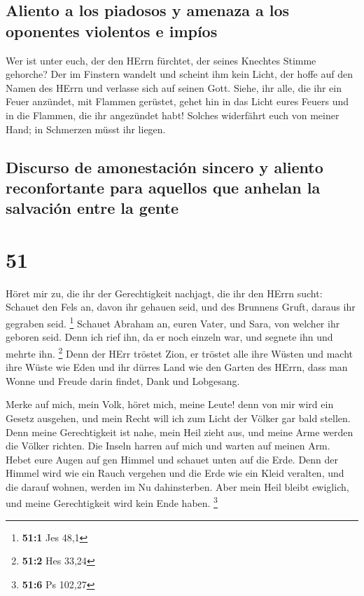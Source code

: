 \hypertarget{aliento-a-los-piadosos-y-amenaza-a-los-oponentes-violentos-e-impuxedos}{%
\subsection{Aliento a los piadosos y amenaza a los oponentes violentos e
impíos}\label{aliento-a-los-piadosos-y-amenaza-a-los-oponentes-violentos-e-impuxedos}}

 Wer ist unter euch, der den HErrn fürchtet, der seines
Knechtes Stimme gehorche? Der im Finstern wandelt und scheint ihm kein
Licht, der hoffe auf den Namen des HErrn und verlasse sich auf seinen
Gott.  Siehe, ihr alle, die ihr ein Feuer anzündet, mit
Flammen gerüstet, gehet hin in das Licht eures Feuers und in die
Flammen, die ihr angezündet habt! Solches widerfährt euch von meiner
Hand; in Schmerzen müsst ihr liegen.

\hypertarget{discurso-de-amonestaciuxf3n-sincero-y-aliento-reconfortante-para-aquellos-que-anhelan-la-salvaciuxf3n-entre-la-gente}{%
\subsection{Discurso de amonestación sincero y aliento reconfortante
para aquellos que anhelan la salvación entre la
gente}\label{discurso-de-amonestaciuxf3n-sincero-y-aliento-reconfortante-para-aquellos-que-anhelan-la-salvaciuxf3n-entre-la-gente}}

\hypertarget{section-50}{%
\section{51}\label{section-50}}

 Höret mir zu, die ihr der Gerechtigkeit nachjagt, die ihr
den HErrn sucht: Schauet den Fels an, davon ihr gehauen seid, und des
Brunnens Gruft, daraus ihr gegraben seid. \footnote{\textbf{51:1} Jes
  48,1}  Schauet Abraham an, euren Vater, und Sara, von
welcher ihr geboren seid. Denn ich rief ihn, da er noch einzeln war, und
segnete ihn und mehrte ihn. \footnote{\textbf{51:2} Hes 33,24}
 Denn der HErr tröstet Zion, er tröstet alle ihre Wüsten
und macht ihre Wüste wie Eden und ihr dürres Land wie den Garten des
HErrn, dass man Wonne und Freude darin findet, Dank und Lobgesang.

 Merke auf mich, mein Volk, höret mich, meine Leute! denn
von mir wird ein Gesetz ausgehen, und mein Recht will ich zum Licht der
Völker gar bald stellen.  Denn meine Gerechtigkeit ist
nahe, mein Heil zieht aus, und meine Arme werden die Völker richten. Die
Inseln harren auf mich und warten auf meinen Arm.  Hebet
eure Augen auf gen Himmel und schauet unten auf die Erde. Denn der
Himmel wird wie ein Rauch vergehen und die Erde wie ein Kleid veralten,
und die darauf wohnen, werden im Nu dahinsterben. Aber mein Heil bleibt
ewiglich, und meine Gerechtigkeit wird kein Ende haben. \footnote{\textbf{51:6}
  Ps 102,27}

